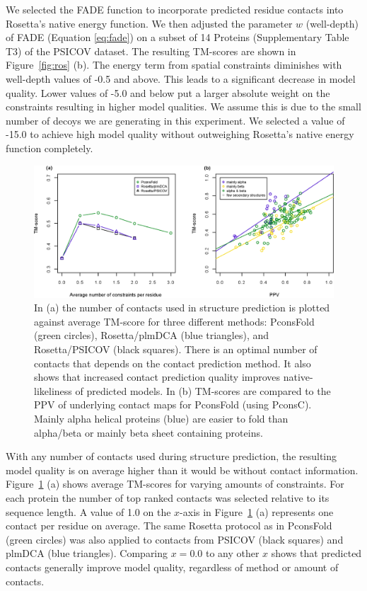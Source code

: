 \documentclass{bioinfo}
\begin{document}
We selected the FADE function to incorporate predicted residue
contacts into Rosetta's native energy function. We then adjusted the
parameter $w$ (well-depth) of FADE (Equation \ref{eq:fade}) on a
subset of 14 Proteins (Supplementary Table T3) of the PSICOV
dataset. The resulting TM-scores are shown in Figure~\ref{fig:ros}
(b). The energy term from spatial constraints diminishes with
well-depth values of -0.5 and above. This leads to a significant
decrease in model quality. Lower values of -5.0 and below put a larger
absolute weight on the constraints resulting in higher model
qualities. We assume this is due to the small number of decoys we are
generating in this experiment. We selected a value of -15.0 to achieve
high model quality without outweighing Rosetta's native energy
function completely.


\begin{figure}[!tpb]%
\centerline{\includegraphics[scale=0.7]{figures/tmscores.eps}}
\caption{In (a) the number of contacts used in structure prediction is plotted against average TM-score for three different methods: PconsFold (green circles), Rosetta/plmDCA (blue triangles), and Rosetta/PSICOV (black squares). There is an optimal number of contacts that depends on the contact prediction method. It also shows that increased contact prediction quality improves native-likeliness of predicted models. In (b) TM-scores are compared to the PPV of underlying contact maps for PconsFold (using PconsC). Mainly alpha helical proteins (blue) are easier to fold than alpha/beta or mainly beta sheet containing proteins.}\label{fig:main}
\end{figure}

With any number of contacts used during structure prediction, the
resulting model quality is on average higher than it would be without
contact information. Figure~\ref{fig:main} (a) shows average TM-scores
for varying amounts of constraints. For each protein the number of top
ranked contacts was selected relative to its sequence length. A value
of 1.0 on the $x$-axis in Figure~\ref{fig:main} (a) represents one
contact per residue on average. The same Rosetta protocol as in
PconsFold (green circles) was also applied to contacts from PSICOV
(black squares) and plmDCA (blue triangles). Comparing $x=0.0$ to any
other $x$ shows that predicted contacts generally improve model
quality, regardless of method or amount of contacts. 
\end{document}
